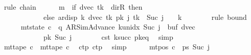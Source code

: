 \begin{isabellebody}
\ {\isacharparenleft}{\kern0pt}rule\ chain{\isacharparenright}{\kern0pt}\isanewline
\ \ \ \ \isamarkupfalse%
\ {\isachardoublequoteopen}m\ {\isacharplus}{\kern0pt}\ {\isacharparenleft}{\kern0pt}if\ dvec\ {\isacharquery}{\kern0pt}tk\ {\isacharequal}{\kern0pt}\ dir{\isachardot}{\kern0pt}R\ then\ {}\isanewline
\ \ \ \ \ \ \ \ \ \ \ \ else\ ar{\isacharunderscore}{\kern0pt}disp\ {\isacharquery}{\kern0pt}k\ {\isacharparenleft}{\kern0pt}dvec\ {\isacharquery}{\kern0pt}tk{\isacharparenright}{\kern0pt}\ {\isacharparenleft}{\kern0pt}{\isacharquery}{\kern0pt}pk\ j\ {\isacharquery}{\kern0pt}tk{\isacharparenright}{\kern0pt}{\isacharparenright}{\kern0pt}\ {\isasymle}\ Suc\ j\ {\isacharasterisk}{\kern0pt}\ {\isacharparenleft}{\kern0pt}{}\ {\isacharasterisk}{\kern0pt}\ {\isacharquery}{\kern0pt}k{\isacharparenright}{\kern0pt}{\isachardoublequoteclose}\isanewline
\ \ \ \ \ \ \isamarkupfalse%
\ {\isacharparenleft}{\kern0pt}rule\ bound{\isacharparenright}{\kern0pt}\isanewline
\ \ \ \ \isamarkupfalse%
\ {\isachardoublequoteopen}mt{\isacharunderscore}{\kern0pt}state\ c{\isacharprime}{\kern0pt}\ {\isacharequal}{\kern0pt}\ {\isacharparenleft}{\kern0pt}q{\isacharcomma}{\kern0pt}\ AR{\isacharunderscore}{\kern0pt}SimAdvance{\isacharcomma}{\kern0pt}\ k{\isacharunderscore}{\kern0pt}unidx\ {\isacharparenleft}{\kern0pt}Suc\ j{\isacharparenright}{\kern0pt}{\isacharcomma}{\kern0pt}\ {}{\isacharcomma}{\kern0pt}\ buf{}{\isacharcomma}{\kern0pt}\ dvec{\isacharcomma}{\kern0pt}\isanewline
\ \ \ \ \ \ \ \ \ \ \ \ {\isacharquery}{\kern0pt}pk\ {\isacharparenleft}{\kern0pt}Suc\ j{\isacharparenright}{\kern0pt}{\isacharparenright}{\kern0pt}{\isachardoublequoteclose}\isanewline
\ \ \ \ \ \ \isamarkupfalse%
\ c{\isacharprime}{\kern0pt}{\isacharunderscore}{\kern0pt}st\ ksucc\ pk{\isacharunderscore}{\kern0pt}eq\ \isamarkupfalse%
\ simp\isanewline
\ \ \ \ \isamarkupfalse%
\ {\isachardoublequoteopen}mt{\isacharunderscore}{\kern0pt}tape\ c{\isacharprime}{\kern0pt}\ {\isacharequal}{\kern0pt}\ mt{\isacharunderscore}{\kern0pt}tape\ c{}{\isachardoublequoteclose}\ \isamarkupfalse%
\ c{\isacharprime}{\kern0pt}{\isacharunderscore}{\kern0pt}tp\ c{\isacharunderscore}{\kern0pt}tp\ \isamarkupfalse%
\ simp\isanewline
\ \ \ \ \isamarkupfalse%
\ {\isachardoublequoteopen}mt{\isacharunderscore}{\kern0pt}pos\ c{\isacharprime}{\kern0pt}\ {\isacharequal}{\kern0pt}\ {\isacharquery}{\kern0pt}ps\ {\isacharparenleft}{\kern0pt}Suc\ j{\isacharparenright}{\kern0pt}{\isachardoublequoteclose}\ \isamarkupfalse%

\end{isabellebody}
